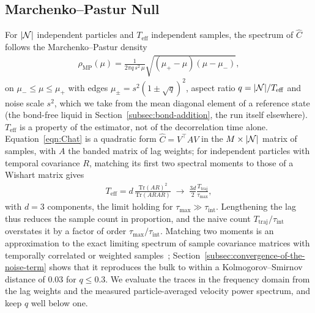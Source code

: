 \subsection{Marchenko--Pastur Null}
\label{subsec:de-noising-correlation-matrices}
For $|\mathcal{N}|$ independent particles and $T_{\text{eff}}$ independent samples, the spectrum of $\hat{C}$ follows the Marchenko--Pastur density~\cite{marchenko1967}
\begin{align}
    \rho_{\text{MP}}(\mu) = \frac{1}{2 \pi q\, s^{2}\, \mu} \sqrt{(\mu_{+} - \mu)(\mu - \mu_{-})},
    \label{eqn:mp-density}
\end{align}
on $\mu_{-} \le \mu \le \mu_{+}$ with edges $\mu_{\pm} = s^{2} (1 \pm \sqrt{q})^{2}$, aspect ratio $q = |\mathcal{N}| / T_{\text{eff}}$ and noise scale $s^{2}$, which we take from the mean diagonal element of a reference state (the bond-free liquid in Section~\ref{subsec:bond-addition}, the run itself elsewhere).
$T_{\text{eff}}$ is a property of the estimator, not of the decorrelation time alone.
Equation~\eqref{eqn:Chat} is a quadratic form $\hat{C} = V^{\top} A V$ in the $M \times |\mathcal{N}|$ matrix of samples, with $A$ the banded matrix of lag weights; for independent particles with temporal covariance $R$, matching its first two spectral moments to those of a Wishart matrix gives
\begin{align}
    T_{\text{eff}} = d\, \frac{\mathrm{Tr}(A R)^{2}}{\mathrm{Tr}(A R A R)} \;\longrightarrow\; \frac{3 d}{2} \frac{T_{\text{traj}}}{\tau_{\max}},
    \label{eqn:teff}
\end{align}
with $d = 3$ components, the limit holding for $\tau_{\max} \gg \tau_{\text{int}}$.
Lengthening the lag thus reduces the sample count in proportion, and the naive count $T_{\text{traj}}/\tau_{\text{int}}$ overstates it by a factor of order $\tau_{\max}/\tau_{\text{int}}$.
Matching two moments is an approximation to the exact limiting spectrum of sample covariance matrices with temporally correlated or weighted samples~\cite{burda2005,pafka2004}; Section~\ref{subsec:convergence-of-the-noise-term} shows that it reproduces the bulk to within a Kolmogorov--Smirnov distance of $0.03$ for $q \le 0.3$.
We evaluate the traces in the frequency domain from the lag weights and the measured particle-averaged velocity power spectrum, and keep $q$ well below one.

